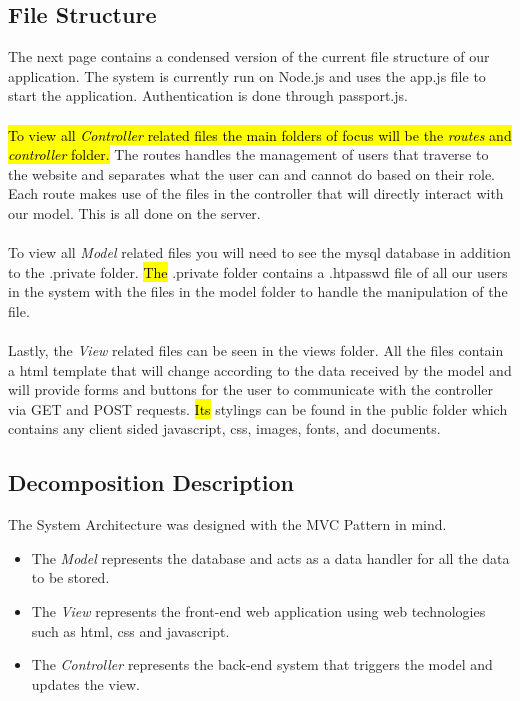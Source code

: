 \documentclass[fontsize=12pt,paper=letter,twoside]{scrartcl}
\begin{document}
\subsection{File Structure}
The next page contains a condensed version of the current file structure of our application. The system is currently run on Node.js and uses the app.js file to start the application. Authentication is done through passport.js. \\ \\ \hl{To view all \emph{Controller} related files the main folders of focus will be the \emph{routes} and \emph{controller} folder.} The routes handles the management of users that traverse to the website and separates what the user can and cannot do based on their role. Each route makes use of the files in the controller  that will directly interact with our model. This is all done on the server. \\
\\ To view all \emph{Model} related files you will need to see the mysql database in addition to the .private folder. \hl{The} .private folder contains a .htpasswd file of all our users in the system with the files in the model folder to handle the manipulation of the file. \\
\\ Lastly, the \emph{View} related files can be seen in the views folder. All the files contain a html template that will change according to the data received by the model and will provide forms and buttons for the user to communicate with the controller via GET and POST requests. \hl{Its} stylings can be found in the public folder which contains any client sided javascript, css, images, fonts, and documents.

\clearpage
\newpage 

\clearpage
\newpage 
\subsection{Decomposition Description}

The System Architecture was designed with the MVC Pattern in mind.

\begin{itemize}
\item The \emph{Model} represents the database and acts as a data handler for all the data to be stored.

\item The \emph{View} represents the front-end web application using web technologies such as html, css and javascript. 

\item The \emph{Controller} represents the back-end system that triggers the model and updates the view.
\end{itemize}
\end{document}
